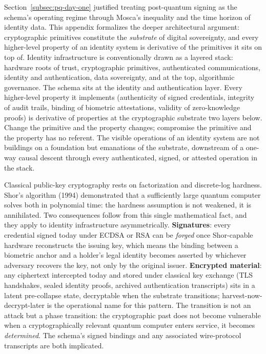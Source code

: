 \documentclass[11pt,letterpaper]{article}
\begin{document}
Section~\ref{subsec:pq-day-one} justified treating post-quantum signing as the schema's operating regime through Mosca's inequality and the time horizon of identity data. This appendix formalizes the deeper architectural argument: cryptographic primitives constitute the \textit{substrate} of digital sovereignty, and every higher-level property of an identity system is derivative of the primitives it sits on top of. Identity infrastructure is conventionally drawn as a layered stack: hardware roots of trust, cryptographic primitives, authenticated communications, identity and authentication, data sovereignty, and at the top, algorithmic governance. The schema sits at the identity and authentication layer. Every higher-level property it implements (authenticity of signed credentials, integrity of audit trails, binding of biometric attestations, validity of zero-knowledge proofs) is derivative of properties at the cryptographic substrate two layers below. Change the primitive and the property changes; compromise the primitive and the property has no referent. The visible operations of an identity system are not buildings on a foundation but emanations of the substrate, downstream of a one-way causal descent through every authenticated, signed, or attested operation in the stack.

Classical public-key cryptography rests on factorization and discrete-log hardness. Shor's algorithm (1994) demonstrated that a sufficiently large quantum computer solves both in polynomial time: the hardness assumption is not weakened, it is annihilated. Two consequences follow from this single mathematical fact, and they apply to identity infrastructure asymmetrically. \textbf{Signatures}: every credential signed today under ECDSA or RSA can be \textit{forged} once Shor-capable hardware reconstructs the issuing key, which means the binding between a biometric anchor and a holder's legal identity becomes asserted by whichever adversary recovers the key, not only by the original issuer. \textbf{Encrypted material}: any ciphertext intercepted today and stored under classical key exchange (TLS handshakes, sealed identity proofs, archived authentication transcripts) sits in a latent pre-collapse state, decryptable when the substrate transitions; harvest-now-decrypt-later is the operational name for this pattern. The transition is not an attack but a phase transition: the cryptographic past does not become vulnerable when a cryptographically relevant quantum computer enters service, it becomes \textit{determined}. The schema's signed bindings and any associated wire-protocol transcripts are both implicated.
\end{document}
